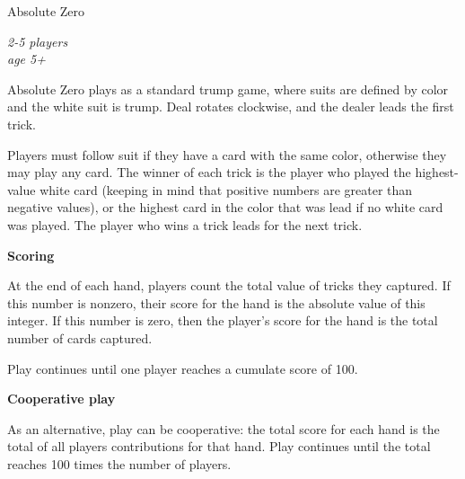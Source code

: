 \documentclass[11pt]{article}
\newcommand\myssection[1]{\begin{center}\bf\small\noindent #1\end{center}}
\newcommand\myheader[1]{\begin{center}\small\sc #1\end{center}}
\begin{document}
\myheader{\Large\sc Absolute Zero}

\tiny

\begin{center}
  \em 2-5 players\\
  age 5+
\end{center}

\noindent Absolute Zero plays as a standard trump game, where suits
are defined by color and the white suit is trump.  Deal rotates
clockwise, and the dealer leads the first trick.

Players must follow suit if they have a card with the same color,
otherwise they may play any card.  The winner of each trick is the
player who played the highest-value white card (keeping in mind that
positive numbers are greater than negative values), or the highest
card in the color that was lead if no white card was played.  The player
who wins a trick leads for the next trick.

\myssection{Scoring} At the end of each hand, players count the
total value of tricks they captured.  If this number is nonzero, their
score for the hand is the absolute value of this integer.  If this
number is zero, then the player's score for the hand is the total
number of cards captured.

Play continues until one player reaches a cumulate score of 100.

\myssection{Cooperative play} As an alternative, play can be
cooperative:  the total score for each hand is the total of all
players contributions for that hand.  Play continues until the total
reaches 100 times the number of players.
\end{document}
